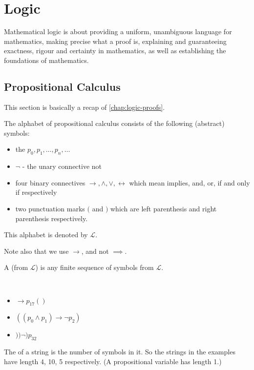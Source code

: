 \chapter{Logic}
Mathematical logic is about providing a uniform, unambiguous language for mathematics, making precise what a proof is, explaining and guaranteeing exactness, rigour and certainty in mathematics, as well as establishing the foundations of mathematics.

\section{Propositional Calculus}
This section is basically a recap of \cref{chap:logic-proofs}.

The alphabet of propositional calculus consists of the following (abstract) symbols:
\begin{itemize}
\item the  $p_0,p_1,\dots,p_n,\dots$
\item {} $\lnot$ - the unary connective not
\item four binary connectives $\rightarrow,\land,\lor,\leftrightarrow$ which mean implies, and, or, if and only if respectively
\item two punctuation marks $($ and $)$ which are left parenthesis and right parenthesis respectively.
\end{itemize}

This alphabet is denoted by $\mathcal{L}$.

\begin{notation}
Note also that we use $\rightarrow$, and not $\implies$.
\end{notation}

\begin{definition}[String]
A  (from $\mathcal{L}$) is any finite sequence of symbols from $\mathcal{L}$.
\end{definition}

\begin{example} \
\begin{itemize}
\item $\rightarrow p_{17}()$
\item $((p_0\land p_1)\rightarrow\lnot p_2)$
\item $))\lnot)p_{32}$
\end{itemize}
\end{example}

The  of a string is the number of symbols in it. So the strings in the examples have length 4, 10, 5 respectively. (A propositional variable has length 1.)

